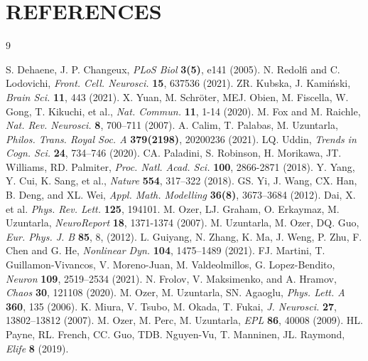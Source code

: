 \documentclass[%
 aip,
 amsmath,amssymb,
 reprint,%
]{revtex4-1}
\begin{document}
\section*{REFERENCES}
	\begin{thebibliography}{9}
		
		 S. Dehaene, J. P. Changeux, \textit{PLoS Biol} \textbf{3(5)}, e141 (2005).
		 N. Redolfi and C. Lodovichi, \textit{Front. Cell. Neurosci.} \textbf{15}, 637536 (2021).
		 ZR. Kubska, J. Kamiński, \textit{Brain Sci.} \textbf{11}, 443 (2021). 
		 X. Yuan, M. Schröter, MEJ. Obien, M. Fiscella, W. Gong, T. Kikuchi, et al., \textit{Nat. Commun.} \textbf{11}, 1-14 (2020).
		 M. Fox and M. Raichle, \textit{Nat. Rev. Neurosci.} \textbf{8}, 700–711 (2007).
		 A. Calim, T. Palabas, M. Uzuntarla, \textit{Philos. Trans. Royal Soc. A} \textbf{379(2198)}, 20200236 (2021).
		 LQ. Uddin, \textit{Trends in Cogn. Sci.} \textbf{24}, 734–746 (2020).
		 CA. Paladini, S. Robinson, H. Morikawa, JT. Williams, RD. Palmiter, \textit{Proc. Natl. Acad. Sci.} \textbf{100}, 2866-2871 (2018).
		 Y. Yang, Y. Cui, K. Sang, et al., \textit{Nature} \textbf{554}, 317–322 (2018).
		 GS. Yi, J. Wang, CX. Han, B. Deng, and XL. Wei, \textit{Appl. Math. Modelling} \textbf{36(8)}, 3673–3684 (2012).
		 Dai, X. et al. \textit{Phys. Rev. Lett.} \textbf{125}, 194101.
		 M. Ozer, LJ. Graham, O. Erkaymaz, M. Uzuntarla, \textit{NeuroReport} \textbf{18}, 1371-1374 (2007).
		 M. Uzuntarla, M. Ozer, DQ. Guo, \textit{Eur. Phys. J. B} \textbf{85}, 8, (2012).
		 L. Guiyang, N. Zhang, K. Ma, J. Weng, P. Zhu, F. Chen and G. He, \textit{Nonlinear Dyn.} \textbf{104}, 1475–1489 (2021).
		 FJ. Martini, T. Guillamon-Vivancos, V. Moreno-Juan, M. Valdeolmillos, G. Lopez-Bendito, \textit{Neuron} \textbf{109}, 2519–2534 (2021).
          N. Frolov, V. Maksimenko, and  A. Hramov, \textit{Chaos} \textbf{30}, 121108 (2020).
		 M. Ozer, M. Uzuntarla, SN. Agaoglu, \textit{ Phys. Lett. A} \textbf{360}, 135 (2006).
		 K. Miura, V. Tsubo, M. Okada, T. Fukai, \textit{J. Neurosci.} \textbf{27}, 13802–13812 (2007).
		 M. Ozer, M. Perc, M. Uzuntarla, \textit{EPL} \textbf{86}, 40008 (2009).
		 HL. Payne, RL. French, CC. Guo, TDB. Nguyen-Vu, T. Manninen, JL. Raymond, \textit{Elife} \textbf{8} (2019).

\end{thebibliography}
\end{document}
